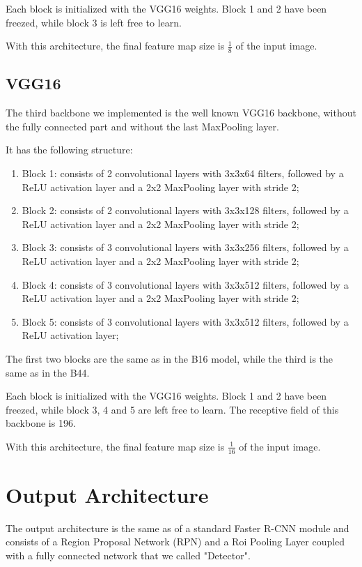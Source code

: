 \documentclass[a4paper,10pt]{report}
\begin{document}
Each block is initialized with the VGG16 weights. Block 1 and 2 have been freezed, while block 3 is left free to learn.

With this architecture, the final feature map size is $\frac{1}{8}$ of the input image.

\subsection{VGG16}\label{subsec:vgg16}
The third backbone we implemented is the well known VGG16 backbone, without the fully connected part and without the last MaxPooling layer.

It has the following structure:
\begin{enumerate}
  \item Block 1: consists of 2 convolutional layers with 3x3x64 filters, followed by a ReLU activation layer and a 2x2 MaxPooling layer with stride 2;
  \item Block 2: consists of 2 convolutional layers with 3x3x128 filters, followed by a ReLU activation layer and a 2x2 MaxPooling layer with stride 2;
  \item Block 3: consists of 3 convolutional layers with 3x3x256 filters, followed by a ReLU activation layer and a 2x2 MaxPooling layer with stride 2;
  \item Block 4: consists of 3 convolutional layers with 3x3x512 filters, followed by a ReLU activation layer and a 2x2 MaxPooling layer with stride 2;
  \item Block 5: consists of 3 convolutional layers with 3x3x512 filters, followed by a ReLU activation layer;
\end{enumerate}
The first two blocks are the same as in the B16 model, while the third is the same as in the B44.

Each block is initialized with the VGG16 weights. Block 1 and 2 have been freezed, while block 3, 4 and 5 are left free to learn. The receptive field of this backbone is 196.

With this architecture, the final feature map size is $\frac{1}{16}$ of the input image.

\section{Output Architecture}\label{sec:output-architecture}
The output architecture is the same as of a standard Faster R-CNN module and consists of a Region Proposal Network (RPN) and a Roi Pooling Layer coupled with a fully connected network that we called "Detector".
\end{document}
